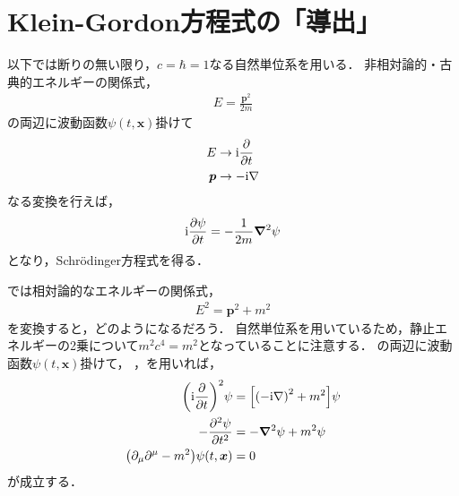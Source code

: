 \documentclass{report}
\begin{document}
  \section{Klein-Gordon方程式の「導出」}
    以下では断りの無い限り，$c = \hbar = 1$なる自然単位系を用いる．
    非相対論的・古典的エネルギーの関係式，
    \begin{align}
      E = \frac{\bm{p}^2}{2m}
    \end{align}
    の両辺に波動函数$\psi(t, \bm{x})$掛けて
    \begin{align}
      E &\to \mathrm{i}\pdv{t} \label{energy-to-diff}\\ 
      \bm{p} &\to -\mathrm{i}\nabla \label{momentum-to-diff}
    \end{align}
    なる変換を行えば，
    \begin{align}
      \mathrm{i}\pdv{\psi}{t} = -\frac{1}{2m}\grad^2\psi
    \end{align}
    となり，Schr\"odinger方程式を得る．
    \par
    では相対論的なエネルギーの関係式，
    \begin{align}
      E^2 = \bm{p}^2 + m^2\label{relativity-energy}
    \end{align}
    を変換すると，どのようになるだろう．
    自然単位系を用いているため，静止エネルギーの2乗について$m^2c^4 = m^2$となっていることに注意する．
    の両辺に波動函数$\psi(t, \bm{x})$掛けて，
    ，を用いれば，
    \begin{align}
      \qty(\mathrm{i}\pdv{t})^2\psi &= \qty[\qty(-\mathrm{i}\nabla)^2 + m^2]\psi \\ 
      -\pdv[2]{\psi}{t} &= -\grad^2\psi + m^2\psi \\ 
      \qty(\partial_{\mu}\partial^{\mu} - m^2)\psi(t, \bm{x}) &= 0
    \end{align}
    が成立する．
\end{document}
